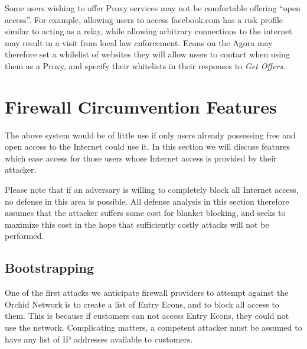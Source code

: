 \documentclass{article}
\newcommand{\orchid}{Orchid}
\newcommand{\Orchid}{\orchid}
\begin{document}
Some users wishing to offer Proxy services may not be comfortable offering ``open access''. For example, allowing users to access facebook.com has a risk profile similar to acting as a relay, while allowing arbitrary connections to the internet may result in a visit from local law enforcement. Econs on the Agora may therefore set a whilelist of websites they will allow users to contact when using them as a Proxy, and specify their whitelists in their responses to \emph{Get Offers}.


\section{Firewall Circumvention Features}
\label{sec:evasion}

The above system would be of little use if only users already
possessing free and open access to the Internet could use it. In this
section we will discuss features which ease access for those users
whose Internet access is provided by their attacker.

Please note that if an adversary is willing to completely block all
Internet access, no defense in this area is possible. All defense
analysis in this section therefore assumes that the attacker suffers
some cost for blanket blocking, and seeks to maximize this cost in the
hope that sufficiently costly attacks will not be performed.

\subsection{Bootstrapping}

One of the first attacks we anticipate firewall providers to attempt
against the \Orchid{} Network is to create a list of Entry Econs, and to
block all access to them. This is because if customers can not access
Entry Econs, they could not use the network. Complicating matters, a
competent attacker must be assumed to have any list of IP addresses
available to customers.

\end{document}
